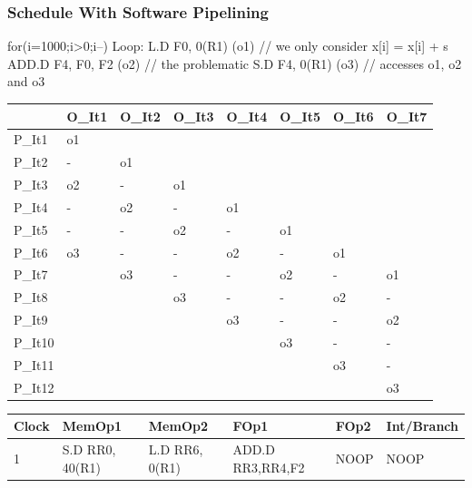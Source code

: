 \documentclass{beamer}
\renewcommand{\emph}[1]{\textcolor{structure}{#1}}
\newcommand{\emp}[1]{\textcolor{DikuRed}{ #1}}
\begin{document}
\begin{frame}[fragile,t]
    \frametitle{Schedule With Software Pipelining}

\begin{colorcode}[fontsize=\tiny]
for(i=1000;i>0;i--)        Loop: L.D   F0, 0(R1)     (o1)   // we only consider
  x[i] = x[i] + s                ADD.D F4, F0, F2    (o2)   // the problematic
                                 S.D   F4, 0(R1)     (o3)   // accesses o1, o2 and o3
\end{colorcode}


\begin{tiny}
\begin{tabular}{llllllll}
\hline
        & O\_It1 & O\_It2 & O\_It3 & O\_It4  & O\_It5 & O\_It6 & O\_It7 \\\hline
\emp{P\_It1}  & o1     &        &        &         &        &        &        \\
\emp{P\_It2}  & -      & o1     &        &         &        &        &        \\
\emp{P\_It3}  & o2     & -      & o1     &         &        &        &        \\
\emp{P\_It4}  & -      & o2     & -      & o1      &        &        &        \\
\emp{P\_It5}  & -      & -      & o2     & -       & o1     &        &        \\
\emph{P\_It6} & o3     & -      & -      & o2      & -      & o1     &        \\
\emph{P\_It7} &        & o3     & -      & -       & o2     & -      & o1     \\
\emp{P\_It8}  &        &        & o3     & -       & -      & o2     & -      \\
\emp{P\_It9}  &        &        &        & o3      & -      & -      & o2     \\
\emp{P\_It10} &        &        &        &         & o3     & -      & -      \\
\emp{P\_It11} &        &        &        &         &        & o3     & -      \\
\emp{P\_It12} &        &        &        &         &        &        & o3     \\
\end{tabular}
\end{tiny}

\smallskip

\begin{tiny}
\begin{tabular}{llllll}
\hline
Clock   & MemOp1         & MemOp2         & FOp1            & FOp2             & Int/Branch \\\hline
1       & S.D RR0, 40(R1)& L.D RR6, 0(R1) & ADD.D RR3,RR4,F2& NOOP             & NOOP \\\hline
\end{tabular}
\end{tiny}


\end{frame}
\end{document}
